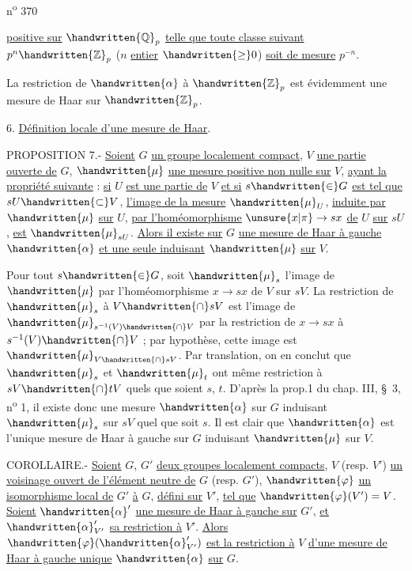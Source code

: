 n\textsuperscript{o} 370

\uline{positive sur} $\handwritten{\mathbb{Q}}_p$ \uline{telle que toute classe suivant} $p^n\handwritten{\mathbb{Z}}_p$ ($n$ \uline{entier} $\handwritten{\geq}0$) \uline{soit de mesure} $p^{-n}$.

La restriction de $\handwritten{\alpha}$ à $\handwritten{\mathbb{Z}}_p$ est évidemment une mesure de Haar sur $\handwritten{\mathbb{Z}}_p$.

6. \uline{Définition locale d'une mesure de Haar}.

PROPOSITION 7.- \uline{Soient} $G$ \uline{un groupe localement compact}, $V$ \uline{une partie ouverte de} $G$,
$\handwritten{\mu}$ \uline{une mesure positive non nulle sur} $V$, \uline{ayant la propriété suivante} : \uline{si} $U$ \uline{est une
partie  de} $V$ \uline{et si} $s\handwritten{\in} G$ \uline{est tel que} $sU\handwritten{\subset} V$, \uline{l'image de la mesure} $\handwritten{\mu}_U$,
\uline{induite par} $\handwritten{\mu}$ \uline{sur} $U$, \uline{par l'homéomorphisme} $\unsure{x|\pi}\to sx$ \uline{de} $U$ \uline{sur} $sU$, \uline{est} $\handwritten{\mu}_{sU}$. \uline{Alors il
existe sur} $G$ \uline{une mesure de Haar à gauche} $\handwritten{\alpha}$ \uline{et une seule induisant} $\handwritten{\mu}$ \uline{sur} $V$.

Pour tout $s\handwritten{\in} G$, soit $\handwritten{\mu}_s$ l'image de $\handwritten{\mu}$ par l'homéomorphisme $x\to sx$ de $V$ sur
$sV$. La restriction de $\handwritten{\mu}_s$ à $V\handwritten{\cap} sV$ est l'image de $\handwritten{\mu}_{s^{-1}(V)\handwritten{\cap} V}$ par la restriction de
$x\to sx$ à $s^{-1}(V)\handwritten{\cap} V$ ; par hypothèse, cette image est $\handwritten{\mu}_{V\handwritten{\cap} sV}$. Par
translation, on en conclut que $\handwritten{\mu}_s$ et $\handwritten{\mu}_t$ ont même restriction à $sV\handwritten{\cap} tV$ quels que
soient $s$, $t$. D'après la prop.1 du chap. III, \S~3, n\textsuperscript{o} 1, il existe donc une mesure $\handwritten{\alpha}$
sur $G$ induisant $\handwritten{\mu}_s$ sur $sV$ quel que soit $s$. Il est clair que $\handwritten{\alpha}$ est l'unique mesure
de Haar à gauche sur $G$ induisant $\handwritten{\mu}$ sur $V$.

COROLLAIRE.- \uline{Soient} $G$, $G'$ \uline{deux groupes localement compacts}, $V$ (resp. $V'$) \uline{un voisinage ouvert de l'élément neutre de} $G$ (resp. $G'$), $\handwritten{\varphi}$ \uline{un isomorphisme local de} $G'$ \uline{à} $G$,
\uline{défini sur} $V'$, \uline{tel que} $\handwritten{\varphi}(V')=V$. \uline{Soient} $\handwritten{\alpha}'$ \uline{une mesure de Haar à gauche sur} $G'$,
\uline{et} $\handwritten{\alpha}'_{V'}$ \uline{sa restriction à} $V'$. \uline{Alors} $\handwritten{\varphi}(\handwritten{\alpha}'_{V'})$ \uline{est la restriction à} $V$ \uline{d'une mesure de
Haar à gauche unique} $\handwritten{\alpha}$ \uline{sur} $G$.

